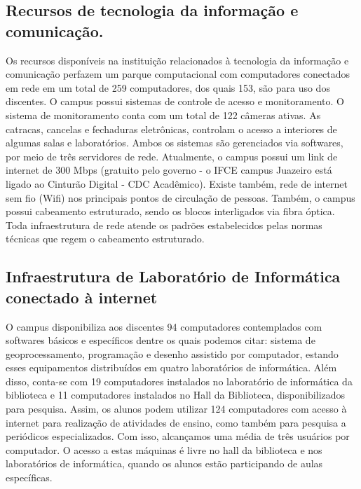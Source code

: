 \subsection{Recursos de tecnologia da informação e comunicação.}
Os recursos disponíveis na instituição relacionados à tecnologia da informação e comunicação perfazem um parque computacional com computadores conectados em rede em um total de 259 computadores, dos quais 153, são para uso dos discentes. O campus possui sistemas de controle de acesso e monitoramento. O sistema de monitoramento conta com um total de 122 câmeras ativas. As catracas, cancelas e fechaduras eletrônicas, controlam o acesso a interiores de algumas salas e laboratórios. Ambos os sistemas são gerenciados via softwares, por meio de três servidores de rede. Atualmente, o campus possui um link de internet de 300 Mbps (gratuito pelo governo - o IFCE campus Juazeiro está ligado ao Cinturão Digital - CDC Acadêmico). Existe também, rede de internet sem fio (Wifi) nos principais pontos de circulação de pessoas. Também, o campus possui cabeamento estruturado, sendo os blocos interligados via fibra óptica. Toda infraestrutura de rede atende os padrões estabelecidos pelas normas técnicas que regem o cabeamento estruturado.\\

\subsection{Infraestrutura de Laboratório de Informática conectado à internet}

O campus disponibiliza aos discentes 94 computadores contemplados com softwares básicos e específicos dentre os quais podemos citar: sistema de geoprocessamento, programação e desenho assistido por computador, estando esses equipamentos distribuídos em quatro laboratórios de informática. Além disso, conta-se com 19 computadores instalados no laboratório de informática da biblioteca e 11 computadores instalados no Hall da Biblioteca, disponibilizados para pesquisa. Assim, os alunos podem utilizar 124 computadores com acesso à internet para realização de atividades de ensino, como também para pesquisa a periódicos especializados. Com isso, alcançamos uma média de três usuários por computador. O acesso a estas máquinas é livre no hall da biblioteca e nos laboratórios de informática, quando os alunos estão participando de aulas específicas.\\









%
%		
\imprimirindice


